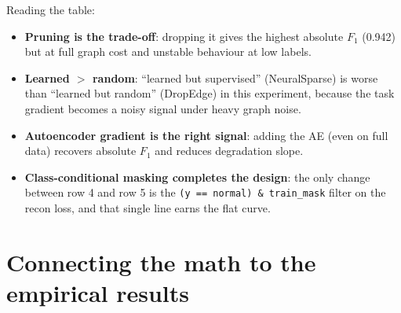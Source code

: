 \documentclass[11pt,a4paper]{article}
\begin{document}
Reading the table:
\begin{itemize}
  \item \textbf{Pruning is the trade-off}: dropping it gives the
        highest absolute $F_1$ (0.942) but at full graph cost and
        unstable behaviour at low labels.
  \item \textbf{Learned $>$ random}: ``learned but supervised''
        (NeuralSparse) is worse than ``learned but random'' (DropEdge)
        in this experiment, because the task gradient becomes a noisy
        signal under heavy graph noise.
  \item \textbf{Autoencoder gradient is the right signal}: adding the
        AE (even on full data) recovers absolute $F_1$ and reduces
        degradation slope.
  \item \textbf{Class-conditional masking completes the design}: the
        only change between row 4 and row 5 is the
        \texttt{(y == normal) \& train\_mask} filter on the recon
        loss, and that single line earns the flat curve.
\end{itemize}

\section{Connecting the math to the empirical results}
\label{sec:results-link}
\end{document}
